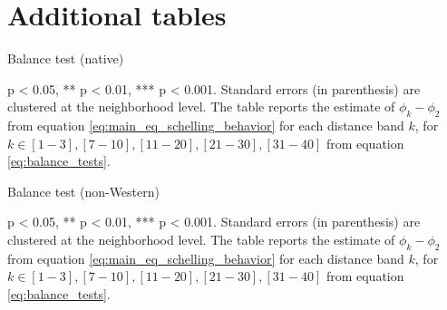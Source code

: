 \documentclass[../main.tex]{subfiles}
\begin{document}
\section{Additional tables}




\begin{table}[H]
    \centering
    \caption{Balance test (native)}
    \label{tab:balance_test_native_full}
    \begin{adjustbox}{width = \linewidth, center}
    \begin{threeparttable}
        
    \begin{tablenotes}[flushleft]
    \item \scriptsize * p < 0.05, ** p < 0.01, *** p < 0.001. Standard errors (in parenthesis) are clustered at the neighborhood level. The table reports the estimate of $\phi_k - \phi_2$ from equation \ref{eq:main_eq_schelling_behavior} for each distance band $k$, for $k\in {[1-3], [7-10], [11-20], [21-30], [31-40]}$ from equation \ref{eq:balance_tests}. 
    \end{tablenotes}
    \end{threeparttable}
    \end{adjustbox}
\end{table}

\begin{table}[H]
    \centering
    \caption{Balance test (non-Western)}
    \label{tab:balance_test_non_west_full}
    \begin{adjustbox}{width = \linewidth, center}
    \begin{threeparttable}
        
    \begin{tablenotes}[flushleft]
    \item \scriptsize * p < 0.05, ** p < 0.01, *** p < 0.001. Standard errors (in parenthesis) are clustered at the neighborhood level. The table reports the estimate of $\phi_k - \phi_2$ from equation \ref{eq:main_eq_schelling_behavior} for each distance band $k$, for $k\in {[1-3], [7-10], [11-20], [21-30], [31-40]}$ from equation \ref{eq:balance_tests}.  
    \end{tablenotes}
\end{threeparttable}
\end{adjustbox}
\end{table}
\end{document}
